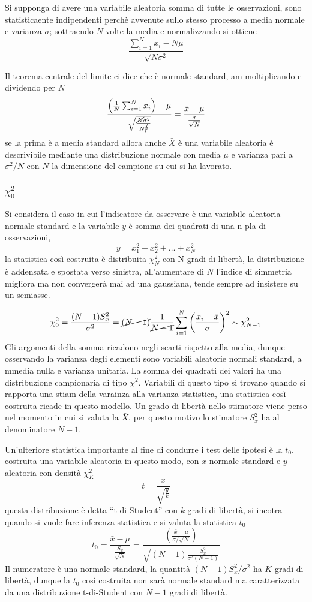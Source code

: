 Si supponga di avere una variabile aleatoria somma di tutte le osservazioni, 
sono statisticaente indipendenti perchè avvenute sullo stesso processo a media 
normale e varianza $\sigma$; sottraendo $N$ volte la media e normalizzando si 
ottiene
$$
\frac{\sum_{i=1}^{N} x_i - N\mu}{\sqrt{N\sigma^2}}
$$

Il teorema centrale del limite ci dice che è normale standard, am moltiplicando e dividendo per $N$ 
$$
\frac{\left(\frac{1}{N}\sum_{i=1}^N x_i\right) - \mu}{\sqrt{\frac{\cancel{N}\sigma^2}{N^{\cancel{2}}}}} = \frac{\bar{x} - \mu}{\frac{\sigma}{\sqrt{N}}}
$$
se la prima è a media standard allora anche $\bar{X}$ è una variabile aleatoria è descrivibile mediante una distribuzione normale con media $\mu$ e varianza pari a $\sigma^2/N$ con $N$ la dimensione del campione su cui si ha lavorato.

\subsubsection{$\chi_0^2$}
Si considera il caso in cui l'indicatore da osservare è una variabile aleatoria normale standard e la variabile $y$ è somma dei quadrati di una n-pla di osservazioni, 
$$
y = x_1^2 + x_2^2+\ldots + x_N^2
$$la statistica così costruita è distribuita $\chi^2_N$ con N gradi di libertà, la distribuzione è addensata e spostata verso sinistra, all'aumentare di $N$ l'indice di simmetria migliora ma non convergerà mai ad una gaussiana, tende sempre ad insistere su un semiasse.

$$
\chi_0^2 = \frac{(N-1)S_x^2}{\sigma^2} = \cancel{(N-1)}\frac{1}{\cancel{N-1}}\sum_{i=1}^N \left(\frac{x_i-\bar{x}}{\sigma}\right)^2 \sim \chi^2_{N-1}
$$
Gli argomenti della somma ricadono negli scarti rispetto alla media, dunque osservando la varianza degli elementi sono variabili aleatorie normali standard, a mmedia nulla e varianza unitaria. La somma dei quadrati dei valori ha una distribuzione campionaria di tipo $\chi^2$.
Variabili di questo tipo si trovano quando si rapporta una stiam della varainza alla varianza statistica, una statistica così costruita ricade in questo modello.
Un grado di libertà nello stimatore viene perso nel momento in cui si valuta la $\bar{X}$, per questo motivo lo stimatore $S_x^2$ ha al denominatore $N-1$.


Un'ulteriore statistica importante al fine di condurre i test delle ipotesi è la $t_0$, costruita una variabile aleatoria in questo modo, con $x$ normale standard e $y$ aleatoria con densità $\chi^2_K$
$$
t = \frac{x}{\sqrt{\frac{y}{k}}}
$$
questa distribuzione è detta ``t-di-Student'' con $k$ gradi di libertà, si incotra quando si vuole fare inferenza statistica e si valuta la statistica $t_0$
$$
t_0 = \frac{\bar{x}-\mu}{\frac{S_x}{\sqrt{N}}} = \frac{\left(\frac{\bar{x} -\mu }{\sigma/\sqrt{N}}\right)}{\sqrt{(N-1)\frac{S_x^2}{\sigma^2(N-1)}}}
$$
Il numeratore è una normale standard, la quantità $(N-1)S^2_x/\sigma^2 $ ha $K$ gradi di libertà, dunque la $t_0$ così costruita non sarà normale standard ma caratterizzata da una distribuzione t-di-Student con $N-1$ gradi di libertà.


